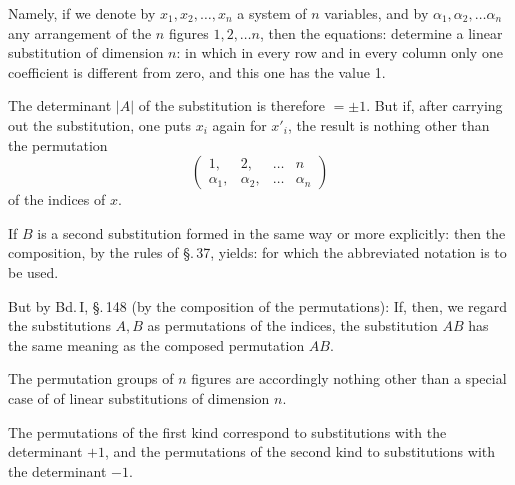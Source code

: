 
Namely, if we denote by $x_1, x_2, \dots, x_n$ a system of $n$ variables, and by $\alpha_1, \alpha_2, \dots \alpha_n$ any arrangement of the $n$ figures $1, 2, \dots n$, then the equations:
determine a linear substitution of dimension $n$:
in which in every row and in every column only one coefficient is different from zero, and this one has the value 1.

The determinant $|A|$ of the substitution is therefore $= \pm 1$. But if, after carrying out the substitution, one puts $x_i$ again for $x'_i$, the result is nothing other than the permutation
\[
\begin{pmatrix} 1, & 2, & \dots & n \\ \alpha_1, & \alpha_2, & \dots & \alpha_n \end{pmatrix}
\]
of the indices of $x$.

If $B$ is a second substitution formed in the same way
or more explicitly:
then the composition, by the rules of \S.\,37, yields:
for which the abbreviated notation
is to be used.

But by Bd.\,I, \S.\,148 (by the composition of the permutations):
If, then, we regard the substitutions $A, B$ as permutations of the indices, the substitution $AB$ has the same meaning as the composed permutation $AB$.

The permutation groups of $n$ figures are accordingly nothing other than a special case of  of linear substitutions of dimension $n$.

The permutations of the first kind correspond to substitutions with the determinant $+1$, and the permutations of the second kind to substitutions with the determinant $-1$.
